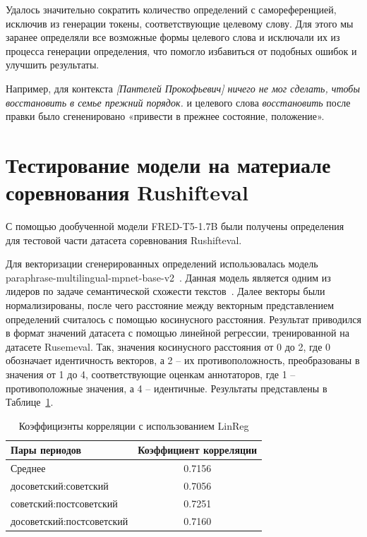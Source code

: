 \documentclass[LI,VKR]{HSEUniversity}
\begin{document}
Удалось значительно сократить количество определений с самореференцией,
исключив из генерации токены, соответствующие целевому слову.
Для этого мы заранее определяли все возможные формы целевого слова и
исключали их из процесса генерации определения,
что помогло избавиться от подобных ошибок и улучшить результаты.

%
Например, для контекста \textit{[Пантелей Прокофьевич] ничего не мог сделать, чтобы восстановить в семье прежний порядок.}
и целевого слова \textit{восстановить} после правки было сгененировано
«привести в прежнее состояние, положение».

\section{Тестирование модели на материале соревнования Rushifteval}

С помощью дообученной модели FRED-T5-1.7B были получены определения для тестовой части датасета
соревнования Rushifteval.

Для векторизации сгенерированных определений использовалась модель paraphrase-multilingual-mpnet-base-v2~.
Данная модель является одним из лидеров по задаче семантической схожести текстов~.
Далее векторы были нормализированы, после чего расстояние между
векторным представлением определений считалось с помощью косинусного расстояния.
Результат приводился в формат значений датасета с помощью линейной регрессии,
тренированной на датасете Rusemeval.
Так, значения косинусного расстояния от 0 до 2, где 0 обозначает идентичность векторов,
а 2 – их противоположность, преобразованы в значения от 1 до 4,
соответствующие оценкам аннотаторов, где 1 – противоположные значения, а 4 – идентичные.
Результаты представлены в Таблице~\ref{tab:Rushifteval results default}.

\begin{table}[H]
\centering
\caption{Коэффициэнты корреляции с использованием LinReg}
\label{tab:Rushifteval results default}
\begin{tabular}{|l|c|}
\hline
\textbf{Пары периодов}                  & \textbf{Коэффициент корреляции} \\
\hline
Среднее            & 0.7156                  \\
\hline
досоветский:советский           & 0.7056                  \\
\hline
советский:постсоветский          & 0.7251                  \\
\hline
досоветский:постсоветский      & 0.7160                  \\
\hline
\end{tabular}
\end{table}
\end{document}
